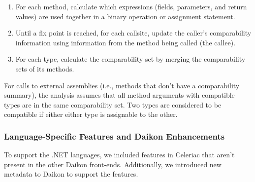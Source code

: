 \begin{enumerate}
\item For each method, calculate which expressions (fields,
  parameters, and return values) are used together in a binary
  operation or assignment statement.
\item Until a fix point is reached, for each callsite, update the
  caller's comparability information using information from the method
  being called (the callee).
\item For each type, calculate the comparability set by merging the
  comparability sets of its methods.
\end{enumerate}

For calls to external assemblies (i.e., methods that don't have a
comparability summary), the analysis assumes that all method arguments
with compatible types are in the same comparability set.
%
Two types are considered to be compatible if either either type is
assignable to the other.

\subsubsection{Language-Specific Features and Daikon Enhancements}

To support the .NET languages, we included features in Celeriac that
aren't present in the other Daikon front-ends. Additionally, we
introduced new metadata to Daikon to support the features.





